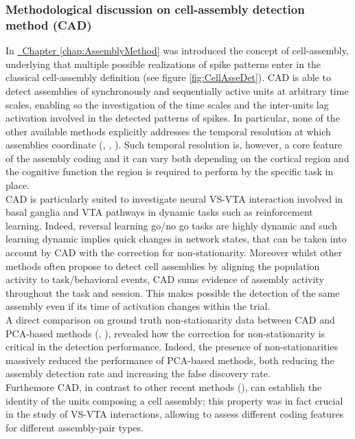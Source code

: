 \subsubsection{Methodological discussion on cell-assembly detection method (CAD)}
In \hyperref[chap:AssemblyMethod]{~Chapter \ref*{chap:AssemblyMethod}} was introduced the concept of cell-assembly, underlying that multiple possible realizations of spike patterns enter in the classical cell-assembly definition (see figure \ref{fig:CellAsseDet}). CAD is able to detect assemblies of synchronously and sequentially active units at arbitrary time scales, enabling so the investigation of the time scales and the inter-units lag activation involved in the detected patterns of spikes. In particular, none of the other available methods explicitly addresses the temporal resolution at which assemblies coordinate (\cite{Gruen}, \cite{Tavoni}, \cite{Billeh}). Such temporal resolution is, however, a core feature of the assembly coding and it can vary both depending on the cortical region and the cognitive function the region is required to perform by the specific task in place.\\CAD is particularly suited to investigate neural VS-VTA interaction involved in basal ganglia and VTA pathways in dynamic tasks such as reinforcement learning. Indeed, reversal learning go/no go tasks are highly dynamic and such learning dynamic implies quick changes in network states, that can be taken into account by CAD with the correction for non-stationarity. Moreover whilst other methods often propose to detect cell assemblies by aligning the population activity to task/behavioral events, CAD sums evidence of assembly activity throughout the task and session. This makes possible the detection of the same assembly even if its time of activation changes within the trial.\\A direct comparison on ground truth non-stationarity data between CAD and PCA-based methods (\cite{Lopes}, \cite{RussoDurstewitz}), revealed how the correction for non-stationarity is critical in the detection performance. Indeed, the presence of non-stationarities massively reduced the performance of PCA-based methods, both reducing the assembly detection rate and increasing the false discovery rate.\\Furthemore CAD, in contrast to other recent methods (\cite{Watanabe2019}), can establish the identity of the units composing a cell assembly; this property was in fact crucial in the study of VS-VTA interactions, allowing to assess different coding features for different assembly-pair types.

